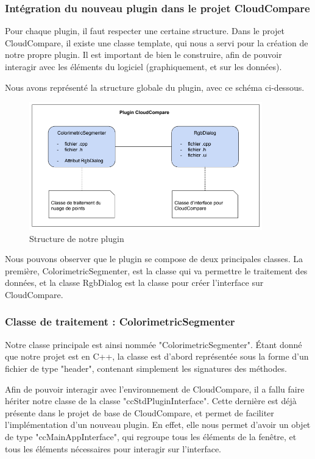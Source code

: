 \documentclass[12pt,titlepage,french]{article}
\begin{document}
\subsubsection{Intégration du nouveau plugin dans le projet CloudCompare}

Pour chaque plugin, il faut respecter une certaine structure. Dans le projet CloudCompare, il existe une classe template, qui nous a servi pour la création de notre propre plugin. Il est important de bien le construire, afin de pouvoir interagir avec les éléments du logiciel (graphiquement, et sur les données). \newline

Nous avons représenté la structure globale du plugin, avec ce schéma ci-dessous.

\begin{figure}[H]
\center
  \includegraphics[width=0.9\textwidth]{./img/architecture_plugin.PNG}
  \caption{\label{} Structure de notre plugin}
\end{figure}

Nous pouvons observer que le plugin se compose de deux principales classes. La première, ColorimetricSegmenter, est la classe qui va permettre le traitement des données, et la classe RgbDialog est la classe pour créer l'interface sur CloudCompare.

\subsubsection{Classe de traitement : ColorimetricSegmenter}

Notre classe principale est ainsi nommée "ColorimetricSegmenter". Étant donné que notre projet est en C++, la classe est d'abord représentée sous la forme d'un fichier de type "header", contenant simplement les signatures des méthodes. \newline

Afin de pouvoir interagir avec l'environnement de CloudCompare, il a fallu faire hériter notre classe de la classe "ccStdPluginInterface". Cette dernière est déjà présente dans le projet de base de CloudCompare, et permet de faciliter l'implémentation d'un nouveau plugin. En effet, elle nous permet d'avoir un objet de type "ccMainAppInterface", qui regroupe tous les éléments de la fenêtre, et tous les éléments nécessaires pour interagir sur l'interface. \newline
\end{document}
